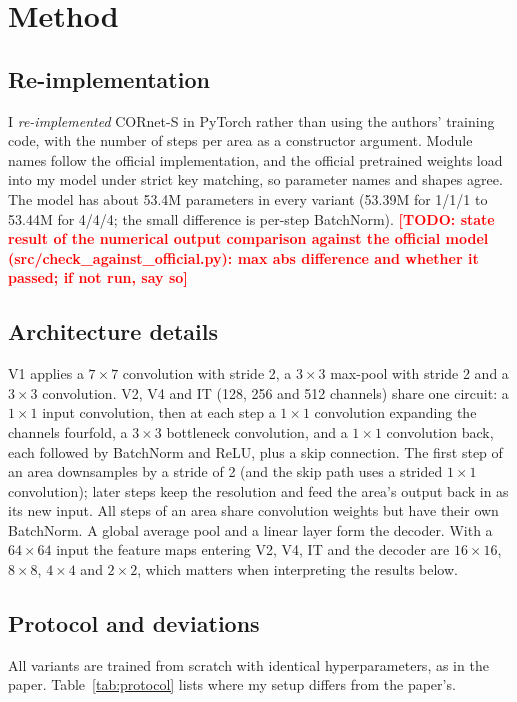 \documentclass[conference]{IEEEtran}
\newcommand{\todo}[1]{\textcolor{red}{\textbf{[TODO: #1]}}}
\begin{document}
\section{Method}
\subsection{Re-implementation}
I \emph{re-implemented} CORnet-S in PyTorch rather than using the authors' training code, with the number of steps per area as a constructor argument. Module names follow the official implementation, and the official pretrained weights load into my model under strict key matching, so parameter names and shapes agree. The model has about 53.4M parameters in every variant (53.39M for 1/1/1 to 53.44M for 4/4/4; the small difference is per-step BatchNorm). \todo{state result of the numerical output comparison against the official model (src/check\_against\_official.py): max abs difference and whether it passed; if not run, say so}


\subsection{Architecture details}
V1 applies a $7\times7$ convolution with stride 2, a $3\times3$ max-pool with stride 2 and a $3\times3$ convolution. V2, V4 and IT (128, 256 and 512 channels) share one circuit: a $1\times1$ input convolution, then at each step a $1\times1$ convolution expanding the channels fourfold, a $3\times3$ bottleneck convolution, and a $1\times1$ convolution back, each followed by BatchNorm and ReLU, plus a skip connection. The first step of an area downsamples by a stride of 2 (and the skip path uses a strided $1\times1$ convolution); later steps keep the resolution and feed the area's output back in as its new input. All steps of an area share convolution weights but have their own BatchNorm. A global average pool and a linear layer form the decoder. With a $64\times64$ input the feature maps entering V2, V4, IT and the decoder are $16\times16$, $8\times8$, $4\times4$ and $2\times2$, which matters when interpreting the results below.
\subsection{Protocol and deviations}
All variants are trained from scratch with identical hyperparameters, as in the paper. Table~\ref{tab:protocol} lists where my setup differs from the paper's.
\end{document}
